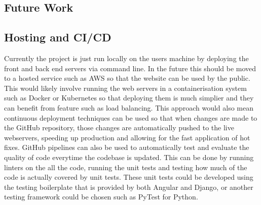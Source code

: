 \begin{description}
\section{Future Work}
\subsection*{Hosting and CI/CD}
Currently the project is just run locally on the users machine by deploying the front and back end servers via command line. 
In the future this should be moved to a hosted service such as AWS so that the website can be used by the public. This would likely involve 
running the web servers in a containerisation system such as Docker or Kubernetes so that deploying them is much simplier and they can benefit from 
feature such as load balancing. This approach would also mean continuous deployment techniques can be used so that when changes are made to the 
GitHub repository, those changes are automatically pushed to the live webservers, speeding up production and allowing for the fast application of hot fixes. 
GitHub pipelines can also be used to automatically test and evaluate the quality of code everytime the codebase is updated. This can be done by 
running linters on the all the code, running the unit tests and testing how much of the code is actually covered by unit tests. 
These unit tests could be developed using the testing boilerplate that is provided by both Angular and Django, or another testing framework could be chosen 
such as PyTest for Python.

\end{description}
